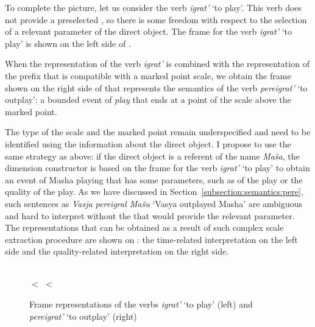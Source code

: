 To complete the picture, let us consider the verb \textit{igrat'} `to play'. This verb does not provide a preselected , so there is some freedom with respect to the selection of a relevant parameter of the direct object. The frame for the verb \textit{igrat'} `to play' is shown on the left side of . 

When the representation of the verb \textit{igrat'} is combined with the representation of the prefix  that is compatible with a marked point  scale, we obtain the frame shown on the right side of  that represents the semantics of the verb \textit{pereigrat'} `to outplay': a bounded event of \MANN \textit{play} that ends at a point of the scale above the marked point. 

The type of the scale and the marked point remain underspecified and need to be identified using the information about the direct object. I propose to use the same strategy as above: if the direct object is a referent of the name \textit{Ma\v{s}a}, the dimension constructor is based on the frame for the verb \textit{igrat'} `to play' to obtain an event of Masha playing that has some parameters, such as  of the play or the quality of the play. As we have discussed in Section~\ref{subsection:semantics:pere}, such sentences as \textit{Vasja pereigral Ma\v{s}u} `Vasya outplayed Masha' are ambiguous and hard to interpret without the  that would provide the relevant parameter. The representations that can be obtained as a result of such complex scale extraction procedure are shown on : the time-related interpretation on the left side and the quality-related interpretation on the right side.

\begin{figure}\small
\begin{minipage}{0.3\textwidth}
\end{minipage}\hfill%
\begin{minipage}{0.65\textwidth}\centering
{}\\
 $<$  $<$ 
\end{minipage}
\caption{Frame representations of the verbs \textit{igrat'} `to play' (left) and \textit{pereigrat'} `to outplay' (right) \label{frame:outplay}}
\end{figure}

